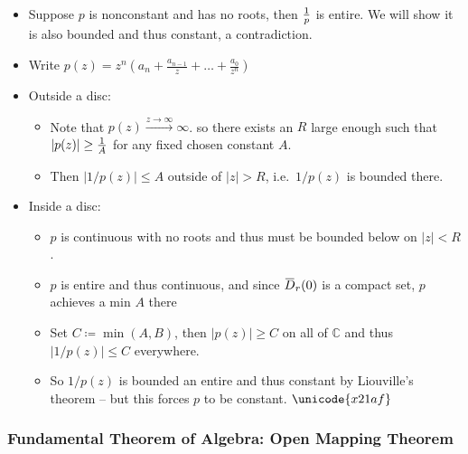 \begin{itemize}
\tightlist
\item
  Suppose \(p\) is nonconstant and has no roots, then \({1\over p}\) is
  entire. We will show it is also bounded and thus constant, a
  contradiction.
\item
  Write
  \(p(z) = z^n \left(a_n + \frac{a_{n-1}}{z}+\dots+\frac{a_{0}}{z^{n}}\right)\)
\item
  Outside a disc:

  \begin{itemize}
  \tightlist
  \item
    Note that \(p(z) \overset{z\to \infty }\to \infty\). so there exists
    an \(R\) large enough such that
    \({\left\lvert {p(z)} \right\rvert} \geq {1\over A}\) for any fixed
    chosen constant \(A\).
  \item
    Then \({\left\lvert { 1/p(z)} \right\rvert} \leq A\) outside of
    \({\left\lvert {z} \right\rvert} >R\), i.e.~\(1/p(z)\) is bounded
    there.
  \end{itemize}
\item
  Inside a disc:

  \begin{itemize}
  \tightlist
  \item
    \(p\) is continuous with no roots and thus must be bounded below on
    \({\left\lvert {z} \right\rvert} < R\).
  \item
    \(p\) is entire and thus continuous, and since
    \(\mkern 1.5mu\overline{\mkern-1.5muD\mkern-1.5mu}\mkern 1.5mu_r(0)\)
    is a compact set, \(p\) achieves a min \(A\) there
  \item
    Set \(C \coloneqq\min(A, B)\), then
    \({\left\lvert {p(z)} \right\rvert} \geq C\) on all of
    \({\mathbb{C}}\) and thus
    \({\left\lvert {1/p(z)} \right\rvert} \leq C\) everywhere.
  \item
    So \(1/p(z)\) is bounded an entire and thus constant by Liouville's
    theorem -- but this forces \(p\) to be constant.
    \({\unicode{x21af}}\)
  \end{itemize}
\end{itemize}

\hypertarget{fundamental-theorem-of-algebra-open-mapping-theorem}{%
\subsubsection{Fundamental Theorem of Algebra: Open Mapping
Theorem}\label{fundamental-theorem-of-algebra-open-mapping-theorem}}

